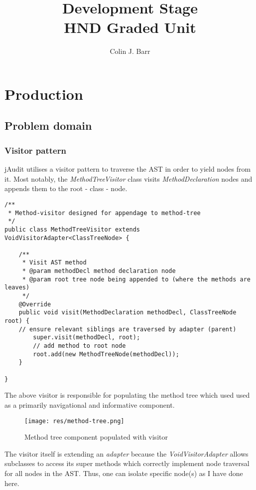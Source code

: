 \documentclass[9pt]{article}
\title{
	Development Stage\\
	\large{HND Graded Unit}\\
}
\author{Colin J. Barr}
\date{}
\renewenvironment{framed}[1][\hsize]
   {\MakeFramed{\hsize#1\advance\hsize-\width \FrameRestore}}%
   {\endMakeFramed}
\begin{document}
\maketitle
\tableofcontents{}

\section{Production}
	\subsection{Problem domain}
		\subsubsection{Visitor pattern}
			jAudit utilises a visitor pattern to traverse the AST in order to
			yield nodes from it. Most notably, the \textit{MethodTreeVisitor}
			class visits \textit{MethodDeclaration} nodes and appends them to
			the root - class - node.

			\begin{framed}[1.2\textwidth]	
				\begin{verbatim}
/**
 * Method-visitor designed for appendage to method-tree
 */
public class MethodTreeVisitor extends VoidVisitorAdapter<ClassTreeNode> {

    /**
     * Visit AST method
     * @param methodDecl method declaration node
     * @param root tree node being appended to (where the methods are leaves)
     */
    @Override
    public void visit(MethodDeclaration methodDecl, ClassTreeNode root) {
	// ensure relevant siblings are traversed by adapter (parent)
        super.visit(methodDecl, root); 
        // add method to root node
        root.add(new MethodTreeNode(methodDecl));
    }

}
				\end{verbatim}
			\end{framed}

			The above visitor is responsible for populating the method tree
			which used used as a primarily navigational and informative
			component.

			\begin{figure}[H]
				\centering
				\texttt{[image: res/method-tree.png]}
				\caption{Method tree component populated with visitor}
			\end{figure}

			The visitor itself is extending an \textit{adapter} because the
			\textit{VoidVisitorAdapter} allows subclasses to access its super
			methods which correctly implement node traversal for all nodes in
			the AST. Thus, one can isolate specific node(s) as I have done here.
\end{document}
